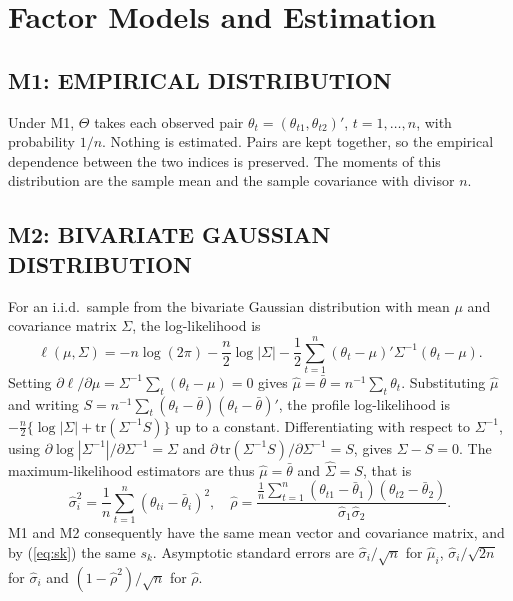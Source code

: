 \section{Factor Models and Estimation}
\label{sec:factormodels}

\subsection{M1: EMPIRICAL DISTRIBUTION}
Under M1, $\Theta$ takes each observed pair $\theta_t=(\theta_{t1},\theta_{t2})'$, $t=1,\dots,n$, with probability $1/n$. Nothing is estimated. Pairs are kept together, so the empirical dependence between the two indices is preserved. The moments of this distribution are the sample mean and the sample covariance with divisor $n$.

\subsection{M2: BIVARIATE GAUSSIAN DISTRIBUTION}
For an i.i.d.\ sample from the bivariate Gaussian distribution with mean $\mu$ and covariance matrix $\Sigma$, the log-likelihood is
\[
\ell(\mu,\Sigma)=-n\log(2\pi)-\frac n2\log|\Sigma|-\frac12\sum_{t=1}^n(\theta_t-\mu)'\Sigma^{-1}(\theta_t-\mu).
\]
Setting $\partial\ell/\partial\mu=\Sigma^{-1}\sum_t(\theta_t-\mu)=0$ gives $\hat\mu=\bar\theta=n^{-1}\sum_t\theta_t$. Substituting $\hat\mu$ and writing $S=n^{-1}\sum_t(\theta_t-\bar\theta)(\theta_t-\bar\theta)'$, the profile log-likelihood is $-\frac n2\{\log|\Sigma|+\mathrm{tr}(\Sigma^{-1}S)\}$ up to a constant. Differentiating with respect to $\Sigma^{-1}$, using $\partial\log|\Sigma^{-1}|/\partial\Sigma^{-1}=\Sigma$ and $\partial\,\mathrm{tr}(\Sigma^{-1}S)/\partial\Sigma^{-1}=S$, gives $\Sigma-S=0$. The maximum-likelihood estimators are thus $\hat\mu=\bar\theta$ and $\hat\Sigma=S$, that is
\[
\hat\sigma_i^2=\frac1n\sum_{t=1}^n(\theta_{ti}-\bar\theta_i)^2,\quad
\hat\rho=\frac{\frac1n\sum_{t=1}^n(\theta_{t1}-\bar\theta_1)(\theta_{t2}-\bar\theta_2)}{\hat\sigma_1\hat\sigma_2}.
\]
M1 and M2 consequently have the same mean vector and covariance matrix, and by (\ref{eq:sk}) the same $s_k$. Asymptotic standard errors are $\hat\sigma_i/\sqrt n$ for $\hat\mu_i$, $\hat\sigma_i/\sqrt{2n}$ for $\hat\sigma_i$ and $(1-\hat\rho^2)/\sqrt n$ for $\hat\rho$.

